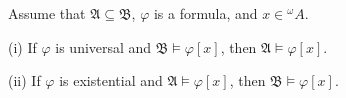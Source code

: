 Assume that $\mathfrak{A} \subseteq \mathfrak{B}$, $\varphi$ is a formula, and $x \in {}^\omega A$.

(i) If $\varphi$ is universal and $\mathfrak{B} \models \varphi[x]$, then $\mathfrak{A} \models \varphi[x]$.

(ii) If $\varphi$ is existential and $\mathfrak{A} \models \varphi[x]$, then $\mathfrak{B} \models \varphi[x]$.
